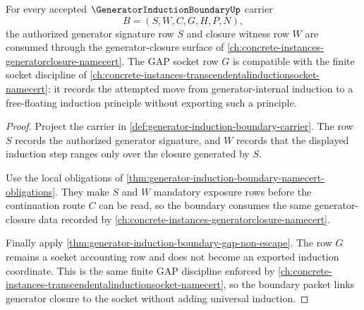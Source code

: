 \begin{theorem}
\label{thm:generator-induction-boundary-generatorclosure-dependency}
For every accepted $\GeneratorInductionBoundaryUp$ carrier
$$
B=(S,W,C,G,H,P,N),
$$
the authorized generator signature row $S$ and closure witness row $W$ are consumed through the generator-closure surface of \autoref{ch:concrete-instances-generatorclosure-namecert}. The GAP socket row $G$ is compatible with the finite socket discipline of \autoref{ch:concrete-instances-transcendentalinductionsocket-namecert}: it records the attempted move from generator-internal induction to a free-floating induction principle without exporting such a principle.
\end{theorem}
\begin{proof}
Project the carrier in \autoref{def:generator-induction-boundary-carrier}. The row $S$ records the authorized generator signature, and $W$ records that the displayed induction step ranges only over the closure generated by $S$.

Use the local obligations of \autoref{thm:generator-induction-boundary-namecert-obligations}. They make $S$ and $W$ mandatory exposure rows before the continuation route $C$ can be read, so the boundary consumes the same generator-closure data recorded by \autoref{ch:concrete-instances-generatorclosure-namecert}.

Finally apply \autoref{thm:generator-induction-boundary-gap-non-escape}. The row $G$ remains a socket accounting row and does not become an exported induction coordinate. This is the same finite GAP discipline enforced by \autoref{ch:concrete-instances-transcendentalinductionsocket-namecert}, so the boundary packet links generator closure to the socket without adding universal induction.
\end{proof}


\begin{closurestatus}{\GeneratorInductionBoundaryUp}
  \theoryclosure{\seedClosure}
  \formalstatus{\unformalizedV}
\end{closurestatus}
